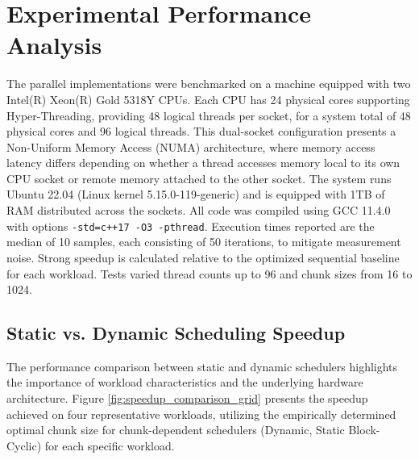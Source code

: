 \documentclass[10pt]{article}
\newcommand{\code}[1]{\texttt{#1}} %
\begin{document}
\section{Experimental Performance Analysis}

The parallel implementations were benchmarked on a machine equipped with two Intel(R) Xeon(R) Gold 5318Y CPUs. Each CPU has 24 physical cores supporting Hyper-Threading, providing 48 logical threads per socket, for a system total of 48 physical cores and 96 logical threads. This dual-socket configuration presents a Non-Uniform Memory Access (NUMA) architecture, where memory access latency differs depending on whether a thread accesses memory local to its own CPU socket or remote memory attached to the other socket. The system runs Ubuntu 22.04 (Linux kernel 5.15.0-119-generic) and is equipped with 1TB of RAM distributed across the sockets. All code was compiled using GCC 11.4.0 with options \code{-std=c++17 -O3 -pthread}. Execution times reported are the median of 10 samples, each consisting of 50 iterations, to mitigate measurement noise. Strong speedup is calculated relative to the optimized sequential baseline for each workload. Tests varied thread counts up to 96 and chunk sizes from 16 to 1024.

\subsection{Static vs. Dynamic Scheduling Speedup}
The performance comparison between static and dynamic schedulers highlights the importance of workload characteristics and the underlying hardware architecture. Figure \ref{fig:speedup_comparison_grid} presents the speedup achieved on four representative workloads, utilizing the empirically determined optimal chunk size for chunk-dependent schedulers (Dynamic, Static Block-Cyclic) for each specific workload.
\end{document}
